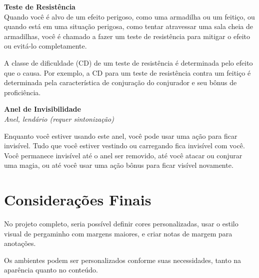 \documentclass{article}
\begin{document}
\vspace{1cm}

\begin{tcolorbox}[title=Regra]
\textbf{Teste de Resistência}\\
Quando você é alvo de um efeito perigoso, como uma armadilha ou um feitiço, ou quando está em uma situação perigosa, como tentar atravessar uma sala cheia de armadilhas, você é chamado a fazer um teste de resistência para mitigar o efeito ou evitá-lo completamente.

A classe de dificuldade (CD) de um teste de resistência é determinada pelo efeito que o causa. Por exemplo, a CD para um teste de resistência contra um feitiço é determinada pela característica de conjuração do conjurador e seu bônus de proficiência.
\end{tcolorbox}

\vspace{1cm}

\begin{tcolorbox}[title=Item Mágico]
\textbf{Anel de Invisibilidade}\\
\textit{Anel, lendário (requer sintonização)}

Enquanto você estiver usando este anel, você pode usar uma ação para ficar invisível. Tudo que você estiver vestindo ou carregando fica invisível com você. Você permanece invisível até o anel ser removido, até você atacar ou conjurar uma magia, ou até você usar uma ação bônus para ficar visível novamente.
\end{tcolorbox}

\section{Considerações Finais}

No projeto completo, seria possível definir cores personalizadas, usar o estilo visual de pergaminho com margens maiores, e criar notas de margem para anotações.

Os ambientes podem ser personalizados conforme suas necessidades, tanto na aparência quanto no conteúdo.
\end{document}
